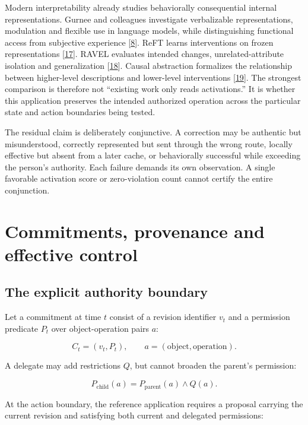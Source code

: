 \documentclass[11pt,letterpaper]{article}
\begin{document}
Modern interpretability already studies behaviorally consequential internal representations. Gurnee and colleagues investigate verbalizable representations, modulation and flexible use in language models, while distinguishing functional access from subjective experience [\hyperref[ref:8]{8}]. ReFT learns interventions on frozen representations [\hyperref[ref:17]{17}]. RAVEL evaluates intended changes, unrelated-attribute isolation and generalization [\hyperref[ref:18]{18}]. Causal abstraction formalizes the relationship between higher-level descriptions and lower-level interventions [\hyperref[ref:19]{19}]. The strongest comparison is therefore not “existing work only reads activations.” It is whether this application preserves the intended authorized operation across the particular state and action boundaries being tested.

The residual claim is deliberately conjunctive. A correction may be authentic but misunderstood, correctly represented but sent through the wrong route, locally effective but absent from a later cache, or behaviorally successful while exceeding the person's authority. Each failure demands its own observation. A single favorable activation score or zero-violation count cannot certify the entire conjunction.

\section{Commitments, provenance and effective control}

\subsection{The explicit authority boundary}

Let a commitment at time \(t\) consist of a revision identifier \(v_t\) and a permission predicate \(P_t\) over object-operation pairs \(a\):

\begin{equation}
C_t=(v_t,P_t),\qquad a=(\text{object},\text{operation}). \tag{1}
\end{equation}

A delegate may add restrictions \(Q\), but cannot broaden the parent's permission:

\begin{equation}
P_{\mathrm{child}}(a)=P_{\mathrm{parent}}(a)\land Q(a). \tag{2}
\end{equation}

At the action boundary, the reference application requires a proposal carrying the current revision and satisfying both current and delegated permissions:
\end{document}
